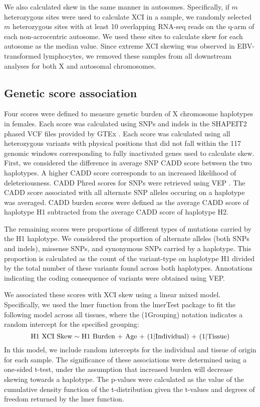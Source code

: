We also calculated skew in the same manner in autosomes. Specifically, if $m$ heterozygous sites were used to calculate XCI in a sample, we randomly selected $m$ heterozygous sites with at least 10 overlapping RNA-seq reads on the q-arm of each non-acrocentric autosome. We used these sites to calculate skew for each autosome as the median value. Since extreme XCI skewing was observed in EBV-transformed lymphocytes, we removed these samples from all downstream analyses for both X and autosomal chromosomes. 

\subsection{Genetic score association}

Four scores were defined to measure genetic burden of X chromosome haplotypes in females. Each score was calculated using SNPs and indels in the SHAPEIT2 phased VCF files provided by GTEx \cite{GTEx_Consortium2020-xx}. Each score was calculated using all heterozygous variants with physical positions that did not fall within the 117 genomic windows corresponding to fully inactivated genes used to calculate skew. First, we considered the difference in average SNP CADD score \cite{Rentzsch2019-pk} between the two haplotypes. A higher CADD score corresponds to an increased likelihood of deleteriousness. CADD Phred scores for SNPs were retrieved using VEP \cite{McLaren2016-jd}. The CADD score associated with all alternate SNP alleles occuring on a haplotype was averaged. CADD burden scores were defined as the average CADD score of haplotype H1 subtracted from the average CADD score of haplotype H2. 

The remaining scores were proportions of different types of mutations carried by the H1 haplotype. We considered the proportion of alternate alleles (both SNPs and indels), missense SNPs, and synonymous SNPs carried by a haplotype. This proportion is calculated as the count of the variant-type on haplotype H1 divided by the total number of these variants found across both haplotypes. Annotations indicating the coding consequence of variants were obtained using VEP. 

We associated these scores with XCI skew using a linear mixed model. Specifically, we used the lmer function from the lmerTest package \cite{Kuznetsova2017-jp} to fit the following model across all tissues, where the (1\textbar Grouping) notation indicates a random intercept for the specified grouping:
\begin{equation}
\text{H1 XCI Skew} \sim \text{H1 Burden + Age + (1\textbar Individual) + (1\textbar Tissue)}
\end{equation}
In this model, we include random intercepts for the individual and tissue of origin for each sample. The significance of these associations were determined using a one-sided t-test, under the assumption that increased burden will decrease skewing towards a haplotype. The p-values were calculated as the value of the cumulative density function of the t-distribution given the t-values and degrees of freedom returned by the lmer function. 

